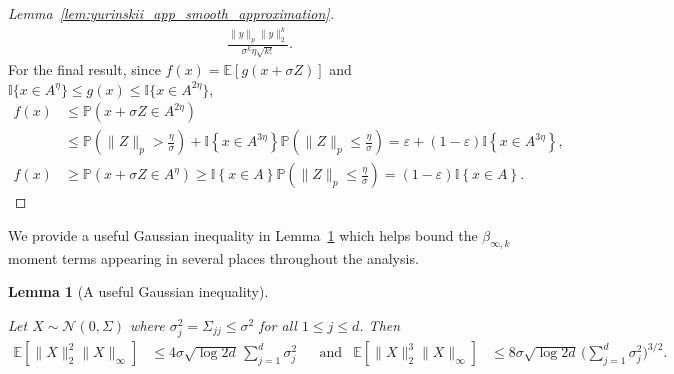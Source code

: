 \documentclass[11pt,lof]{puthesis}
\renewcommand{\P}{\ensuremath{\mathbb{P}}}
\newcommand{\E}{\ensuremath{\mathbb{E}}}
\newcommand{\I}{\ensuremath{\mathbb{I}}}
\newcommand{\cN}{\ensuremath{\mathcal{N}}}
\theoremstyle{break}
\newtheorem{lemma}{Lemma}[section]
\theoremstyle{proof}
\newtheorem{proof}{Proof}
\begin{document}
\begin{proof}[Lemma~\ref{lem:yurinskii_app_smooth_approximation}]
\begin{align*}
    \frac{\|y\|_p \|y\|_2^k}{\sigma^k \eta \sqrt{k!}}.
  \end{align*}
  For the final result, since
  $f(x) = \E \left[ g(x + \sigma Z) \right]$ and
  $\I\big\{x \in A^\eta\big\}\leq g(x)\leq \I\big\{x \in A^{2\eta}\big\}$,
  \begin{align*}
    f(x)
    &\leq
    \P \left( x + \sigma Z \in A^{2 \eta} \right) \\
    &\leq
    \P \left( \|Z\|_p > \frac{\eta}{\sigma} \right)
    + \I \left\{ x \in A^{3 \eta} \right\}
    \P \left( \|Z\|_p \leq \frac{\eta}{\sigma} \right)
    = \varepsilon
    + (1 - \varepsilon) \I \left\{ x \in A^{3 \eta} \right\}, \\
    f(x)
    &\geq
    \P \left( x + \sigma Z \in A^{\eta} \right)
    \geq
    \I \left\{ x \in A \right\}
    \P \left( \|Z\|_p \leq \frac{\eta}{\sigma} \right)
    = (1 - \varepsilon) \I \left\{ x \in A \right\}.
  \end{align*}
\end{proof}

We provide a useful Gaussian inequality in
Lemma~\ref{lem:yurinskii_app_gaussian_useful}
which helps bound the $\beta_{\infty,k}$ moment terms appearing in several
places throughout the analysis.

\begin{lemma}[A useful Gaussian inequality]%
  \label{lem:yurinskii_app_gaussian_useful}

  Let $X \sim \cN(0, \Sigma)$
  where $\sigma_j^2 = \Sigma_{j j} \leq \sigma^2$ for all $1 \leq j \leq d$.
  Then
  \begin{align*}
    \E\left[
      \|X\|_2^2
      \|X\|_\infty
    \right]
    &\leq
    4 \sigma \sqrt{\log 2d}
    \,\sum_{j=1}^d \sigma_j^2
    &&\text{and}
    &\E\left[
      \|X\|_2^3
      \|X\|_\infty
    \right]
    &\leq
    8 \sigma \sqrt{\log 2d}
    \,\bigg( \sum_{j=1}^d \sigma_j^2 \bigg)^{3/2}.
  \end{align*}
\end{lemma}
\end{document}
